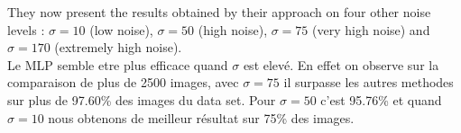 \documentclass[10pt,a4paper]{article}
\begin{document}
They now present the results obtained by their approach on four other
noise levels : $\sigma = 10$ (low noise), $\sigma = 50$
(high noise), $\sigma = 75$ (very high noise) and $\sigma = 170$ (extremely high noise). \\
Le MLP semble etre plus efficace quand $\sigma$ est elevé. En effet on observe sur la comparaison de plus de 2500 images, avec $\sigma = 75$ il surpasse les autres methodes sur plus de 97.60\% des images du data set. Pour $\sigma = 50$ c'est 95.76\% et quand $\sigma = 10$ nous obtenons de meilleur résultat sur 75\% des images.


\printbibliography
\end{document}
